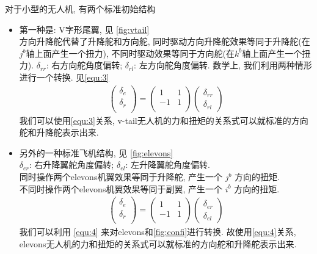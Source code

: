 \documentclass[UTF8,a4paper,10pt,nocolorlinks]{ctexart}
\begin{document}
    \par 
    \par 对于小型的无人机, 有两个标准初始结构 \par
    \begin{itemize}
      \item 第一种是: V字形尾翼, 见 \ref{fig:vtail} \\
      方向升降舵代替了升降舵和方向舵, 同时驱动方向升降舵效果等同于升降舵(在$j^{b}$轴上面产生一个扭力), 不同时驱动效果等同于方向舵(在$k^{b}$轴上面产生一个扭力). $\delta_{rr}$: 右方向舵角度偏转; $\delta_{rl}$: 左方向舵角度偏转. 
      数学上, 我们利用两种情形进行一个转换. 见\ref{equ:3}
      \begin{gather}
        \begin{pmatrix}
          \delta_{e} \\
          \delta_{r} \\
        \end{pmatrix} = 
        \begin{pmatrix}
          1 & 1 \\
          -1 & 1 \\
        \end{pmatrix} 
        \begin{pmatrix}
          \delta_{rr} \\
          \delta_{rl}
        \end{pmatrix}
        \label{equ:3}
      \end{gather}
      我们可以使用\ref{equ:3}关系, v-tail无人机的力和扭矩的关系式可以就标准的方向舵和升降舵表示出来.
      \item 另外的一种标准飞机结构, 见 \ref{fig:elevons}\\
      $\delta_{er}$: 右升降翼舵角度偏转; $\delta_{el}$: 左升降翼舵角度偏转. \\
      同时操作两个elevons机翼效果等同于升降舵, 产生一个 $j^{b}$ 方向的扭矩. \\
      不同时操作两个elevons机翼效果等同于副翼, 产生一个 $i^{b}$ 方向的扭矩. \\
      \begin{gather}
        \begin{pmatrix}
          \delta_{e} \\
          \delta_{r} \\
        \end{pmatrix} = 
        \begin{pmatrix}
          1 & 1 \\
          -1 & 1 \\
        \end{pmatrix} 
        \begin{pmatrix}
          \delta_{er} \\
          \delta_{el}
        \end{pmatrix}
        \label{equ:4}
      \end{gather}
      我们可以利用 \ref{equ:4} 来对elevons和\ref{fig:confi}进行转换. 
      故使用\ref{equ:4}关系, elevons无人机的力和扭矩的关系式可以就标准的方向舵和升降舵表示出来.
    \end{itemize}
\end{document}
